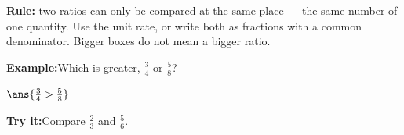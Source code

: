\documentclass[12pt]{article}
\begin{document}
\begin{formulabox}
\textbf{Rule:} two ratios can only be compared at the same place --- the same
number of one quantity. Use the unit rate, or write both as fractions with a
common denominator. Bigger boxes do not mean a bigger ratio.
\end{formulabox}
\begin{examplebox}
\textbf{Example:}\quad Which is greater, $\frac{3}{4}$ or $\frac{5}{8}$?
\par
$\ans{\frac{3}{4} > \frac{5}{8}}$
\end{examplebox}
\begin{tryitbox}
\textbf{Try it:}\quad Compare $\frac{2}{3}$ and $\frac{5}{6}$.\\[2pt]
\end{tryitbox}
\end{document}
